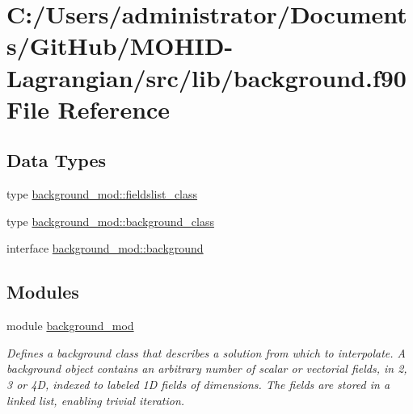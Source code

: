 \hypertarget{background_8f90}{}\section{C\+:/\+Users/administrator/\+Documents/\+Git\+Hub/\+M\+O\+H\+I\+D-\/\+Lagrangian/src/lib/background.f90 File Reference}
\label{background_8f90}
\subsection*{Data Types}
\begin{DoxyCompactItemize}
\item 
type \mbox{\hyperlink{structbackground__mod_1_1fieldslist__class}{background\+\_\+mod\+::fieldslist\+\_\+class}}
\item 
type \mbox{\hyperlink{structbackground__mod_1_1background__class}{background\+\_\+mod\+::background\+\_\+class}}
\item 
interface \mbox{\hyperlink{interfacebackground__mod_1_1background}{background\+\_\+mod\+::background}}
\end{DoxyCompactItemize}
\subsection*{Modules}
\begin{DoxyCompactItemize}
\item 
module \mbox{\hyperlink{namespacebackground__mod}{background\+\_\+mod}}
\begin{DoxyCompactList}\small\item\em Defines a background class that describes a solution from which to interpolate. A background object contains an arbitrary number of scalar or vectorial fields, in 2, 3 or 4D, indexed to labeled 1D fields of dimensions. The fields are stored in a linked list, enabling trivial iteration. \end{DoxyCompactList}\end{DoxyCompactItemize}
